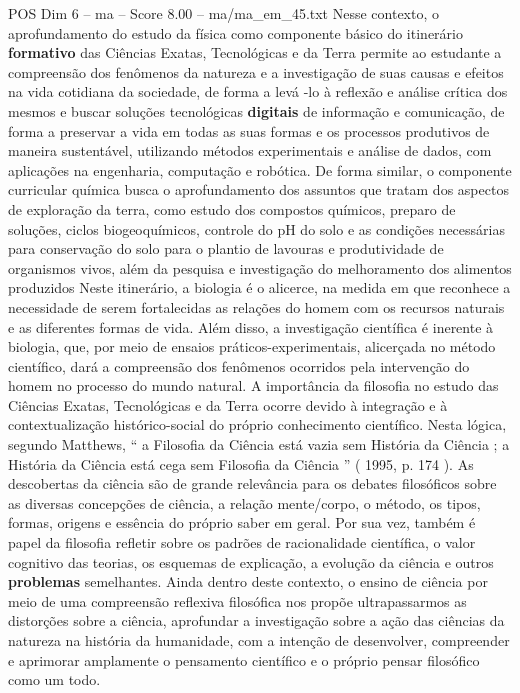 \begin{textsample}{POS Dim 6 – ma – Score 8.00 – ma/ma\_em\_45.txt}
Nesse contexto, o aprofundamento do estudo da física como componente básico do itinerário \textbf{formativo} das Ciências Exatas, Tecnológicas e da Terra permite ao estudante a compreensão dos fenômenos da natureza e a investigação de suas causas e efeitos na vida cotidiana da sociedade, de forma a levá -lo à reflexão e análise crítica dos mesmos e buscar soluções tecnológicas \textbf{digitais} de informação e comunicação, de forma a preservar a vida em todas as suas formas e os processos produtivos de maneira sustentável, utilizando métodos experimentais e análise de dados, com aplicações na engenharia, computação e robótica.
De forma similar, o componente curricular química busca o aprofundamento dos assuntos que tratam dos aspectos de exploração da terra, como estudo dos compostos químicos, preparo de soluções, ciclos biogeoquímicos, controle do pH do solo e as condições necessárias para conservação do solo para o plantio de lavouras e produtividade de organismos vivos, além da pesquisa e investigação do melhoramento dos alimentos produzidos Neste itinerário, a biologia é o alicerce, na medida em que reconhece a necessidade de serem fortalecidas as relações do homem com os recursos naturais e as diferentes formas de vida.
Além disso, a investigação científica é inerente à biologia, que, por meio de ensaios práticos-experimentais, alicerçada no método científico, dará a compreensão dos fenômenos ocorridos pela intervenção do homem no processo do mundo natural.
A importância da filosofia no estudo das Ciências Exatas, Tecnológicas e da Terra ocorre devido à integração e à contextualização histórico-social do próprio conhecimento científico.
Nesta lógica, segundo Matthews, “ a Filosofia da Ciência está vazia sem História da Ciência ; a História da Ciência está cega sem Filosofia da Ciência ” ( 1995, p. 174 ).
As descobertas da ciência são de grande relevância para os debates filosóficos sobre as diversas concepções de ciência, a relação mente/corpo, o método, os tipos, formas, origens e essência do próprio saber em geral.
Por sua vez, também é papel da filosofia refletir sobre os padrões de racionalidade científica, o valor cognitivo das teorias, os esquemas de explicação, a evolução da ciência e outros \textbf{problemas} semelhantes.
Ainda dentro deste contexto, o ensino de ciência por meio de uma compreensão reflexiva filosófica nos propõe ultrapassarmos as distorções sobre a ciência, aprofundar a investigação sobre a ação das ciências da natureza na história da humanidade, com a intenção de desenvolver, compreender e aprimorar amplamente o pensamento científico e o próprio pensar filosófico como um todo.

\end{textsample}

